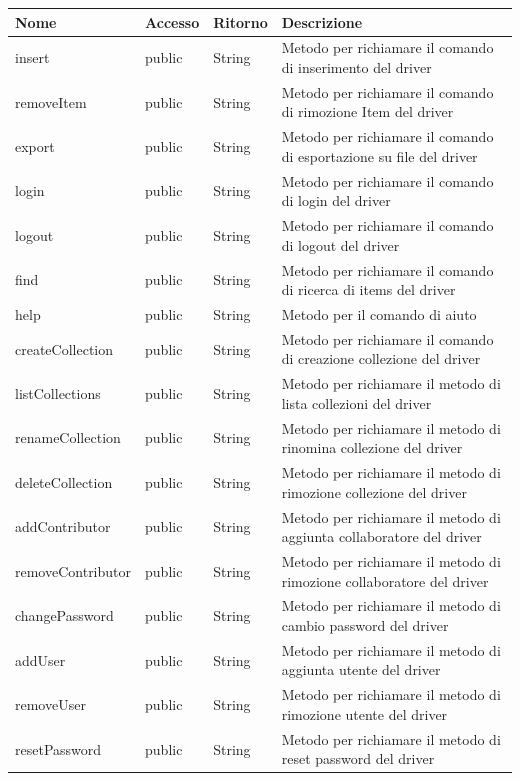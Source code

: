\documentclass{scalatekids-article}
\begin{document}
\begin{tabular}{| l | l | l | l |}
  \hline
  Nome & Accesso & Ritorno & Descrizione\\
  \hline
  insert & public & String & Metodo per richiamare il comando di inserimento del driver\\
  \hline
  removeItem & public & String & Metodo per richiamare il comando di rimozione Item del driver\\
  \hline
  export & public & String & Metodo per richiamare il comando di esportazione su file del driver\\
  \hline
  login & public & String & Metodo per richiamare il comando di login del driver\\
  \hline
  logout & public & String & Metodo per richiamare il comando di logout del driver\\
  \hline
  find & public & String & Metodo per richiamare il comando di ricerca di items del driver\\
  \hline
  help & public & String & Metodo per il comando di aiuto\\
  \hline
  createCollection & public & String & Metodo per richiamare il comando di creazione collezione del driver\\
  \hline
  listCollections & public & String & Metodo per richiamare il metodo di lista collezioni del driver\\
  \hline
  renameCollection & public & String & Metodo per richiamare il metodo di rinomina collezione del driver\\
  \hline
  deleteCollection & public & String & Metodo per richiamare il metodo di rimozione collezione del driver\\
  \hline
  addContributor & public & String & Metodo per richiamare il metodo di aggiunta collaboratore del driver\\
  \hline
  removeContributor & public & String & Metodo per richiamare il metodo di rimozione collaboratore del driver\\
  \hline
  changePassword & public & String & Metodo per richiamare il metodo di cambio password del driver\\
  \hline
  addUser & public & String & Metodo per richiamare il metodo di aggiunta utente del driver\\
  \hline
  removeUser & public & String & Metodo per richiamare il metodo di rimozione utente del driver\\
  \hline
  resetPassword & public & String & Metodo per richiamare il metodo di reset password del driver\\
  \hline
\end{tabular}
\end{document}
